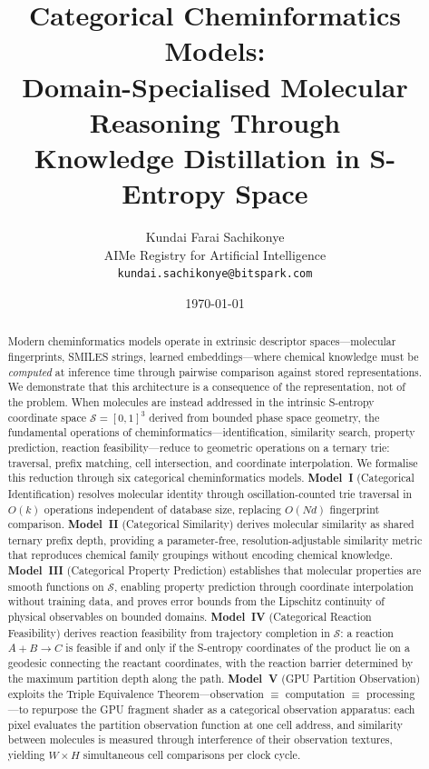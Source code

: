 \documentclass[11pt,twocolumn,a4paper]{article}
\theoremstyle{definition}
\theoremstyle{remark}
\newcommand{\Sspace}{\mathcal{S}}
\begin{document}
\title{\textbf{Categorical Cheminformatics Models: \\
Domain-Specialised Molecular Reasoning Through \\
Knowledge Distillation in S-Entropy Space}}

\author{
Kundai Farai Sachikonye\\[0.3em]
AIMe Registry for Artificial Intelligence\\[0.3em]
\texttt{kundai.sachikonye@bitspark.com}
}

\date{\today}

\maketitle

\begin{abstract}
Modern cheminformatics models operate in extrinsic descriptor spaces---molecular fingerprints, SMILES strings, learned embeddings---where chemical knowledge must be \emph{computed} at inference time through pairwise comparison against stored representations. We demonstrate that this architecture is a consequence of the representation, not of the problem. When molecules are instead addressed in the intrinsic S-entropy coordinate space $\Sspace = [0,1]^3$ derived from bounded phase space geometry, the fundamental operations of cheminformatics---identification, similarity search, property prediction, reaction feasibility---reduce to geometric operations on a ternary trie: traversal, prefix matching, cell intersection, and coordinate interpolation. We formalise this reduction through six categorical cheminformatics models. \textbf{Model~I} (Categorical Identification) resolves molecular identity through oscillation-counted trie traversal in $O(k)$ operations independent of database size, replacing $O(Nd)$ fingerprint comparison. \textbf{Model~II} (Categorical Similarity) derives molecular similarity as shared ternary prefix depth, providing a parameter-free, resolution-adjustable similarity metric that reproduces chemical family groupings without encoding chemical knowledge. \textbf{Model~III} (Categorical Property Prediction) establishes that molecular properties are smooth functions on $\Sspace$, enabling property prediction through coordinate interpolation without training data, and proves error bounds from the Lipschitz continuity of physical observables on bounded domains. \textbf{Model~IV} (Categorical Reaction Feasibility) derives reaction feasibility from trajectory completion in $\Sspace$: a reaction $A + B \to C$ is feasible if and only if the S-entropy coordinates of the product lie on a geodesic connecting the reactant coordinates, with the reaction barrier determined by the maximum partition depth along the path. \textbf{Model~V} (GPU Partition Observation) exploits the Triple Equivalence Theorem---observation $\equiv$ computation $\equiv$ processing---to repurpose the GPU fragment shader as a categorical observation apparatus: each pixel evaluates the partition observation function at one cell address, and similarity between molecules is measured through interference of their observation textures, yielding $W \times H$ simultaneous cell comparisons per clock cycle. 
\end{abstract}
\end{document}
